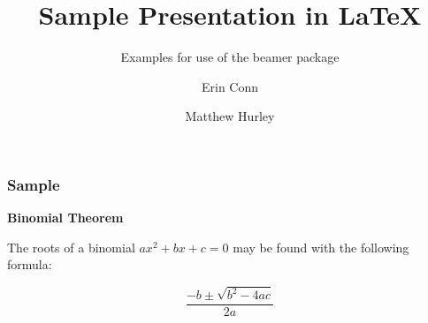 \documentclass{beamer}
\title[Presentation] %
{Sample Presentation in LaTeX}
\subtitle{Examples for use of the beamer package}
\author[Conn, Hurley] %
{Erin Conn \and Matthew Hurley}
{
   \inst{1} %
   University of North Carolina at Chapel Hill \\
   Department of Physics and Astronomy
}
\begin{document}
    \frame{\titlepage}
    
    \begin{frame}
        \frametitle{Sample}

        \textbf{Binomial Theorem}

        The roots of a binomial \(ax^2+bx+c=0\) may be found with the
        following formula:

        \[ \frac{-b \pm \sqrt{b^2-4ac}}{2a} \]

    \end{frame}
\end{document}
